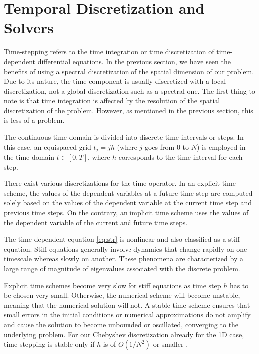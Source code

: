 
\section{Temporal Discretization and Solvers} \label{sec:time}

Time-stepping refers to the time integration or time discretization of
time-dependent differential equations. In the previous section, we have seen
the benefits of using a spectral discretization of the spatial dimension of our
problem. Due to its nature, the time component is usually discretized with a
local discretization, not a global discretization such as a spectral one. The
first thing to note is that time integration is affected by the resolution of
the spatial discretization of the problem. However, as mentioned in the
previous section, this is less of a problem. 

The continuous time domain is divided into discrete time intervals or steps. In
this case, an equispaced grid $t_j = jh$ (where $j$ goes from $0$ to $N$) is
employed in the time domain $t \in [0, T]$, where $h$ corresponds to the time
interval for each step.

There exist various discretizations for the time operator. In an explicit time
scheme, the values of the dependent variables at a future time step are
computed solely based on the values of the dependent variable at the current
time step and previous time steps. On the contrary, an implicit time scheme
uses the values of the dependent variable of the current and future time steps.

The time-dependent equation \eqref{eq:str} is nonlinear and also classified as
a stiff equation. Stiff equations generally involve dynamics that change
rapidly on one timescale whereas slowly on another. These phenomena are
characterized by a large range of magnitude of eigenvalues associated with the
discrete problem.

Explicit time schemes become very slow for stiff equations as time step $h$ has
to be chosen very small. Otherwise, the numerical scheme will become unstable,
meaning that the numerical solution will not. A stable time scheme ensures that
small errors in the initial conditions or numerical approximations do not
amplify and cause the solution to become unbounded or oscillated, converging to
the underlying problem. For our Chebyshev discretization already for the 1D
case, time-stepping is stable only if $h$ is of $O(1/N^2)$ or smaller
\citep{boyd2001}.

